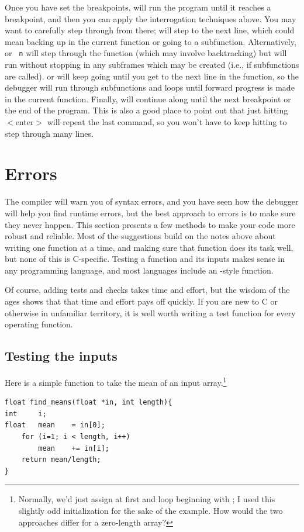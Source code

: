 \documentclass[12pt]{article}
\begin{document}
Once you have set the breakpoints,  will run the program until it
reaches a breakpoint, and then you can apply the interrogation techniques
above. You may want to carefully step through from there; 
will step to the next line, which could mean backing up in the current
function or going to a subfunction. Alternatively,  or {\tt
n} will step through the function (which may involve backtracking) but
will run without stopping in any subframes which may be created
(i.e., if subfunctions are called).   or  will keep
going until you get to the next line in the function, so the debugger
will run through subfunctions and loops until forward progress is made
in the current function.  Finally,  will continue along until the next
breakpoint or the end of the program. This is also a good place to
point out that just hitting $<$enter$>$ will repeat the last command,
so you won't have to keep hitting  to step through many lines.

\section{\treesymbol Errors} The compiler will warn you of syntax
errors, and you have seen how the debugger will help you find runtime
errors, but the best approach to errors is to make sure they never
happen. This section presents a few methods to make your code more
robust and reliable. Most of the suggestions build on the notes above
about writing one function at a time, and making sure that function does
its task well, but
none of this is C-specific. Testing a function and its inputs makes
sense in any programming language, and most languages include an 
-style function.

Of course, adding tests and checks takes time and effort, but the
wisdom of the ages shows that that time and effort pays off quickly.
If you are new to C or otherwise in unfamiliar territory, it is well
worth writing a test function for every operating function.


\subsection{Testing the inputs} Here is a simple function to take the
mean of an input array.\footnote{Normally, we'd just assign
 at first and loop beginning with ; I used this slightly odd initialization
for the sake of the example. How would the two approaches differ for a
zero-length array?}
\begin{lstlisting}
float find_means(float *in, int length){
int     i;
float   mean    = in[0];
    for (i=1; i < length, i++)
        mean    += in[i];
    return mean/length;
}
\end{lstlisting}
\end{document}
